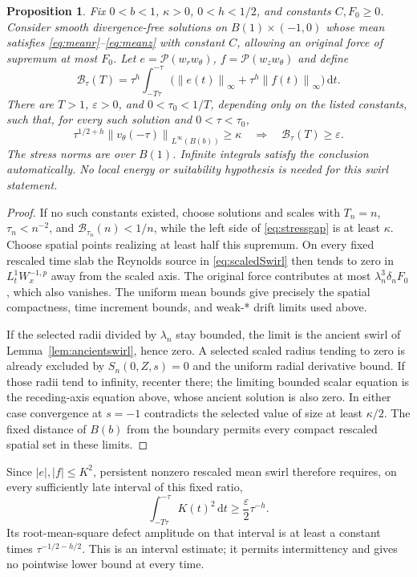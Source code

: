 \documentclass[11pt]{article}
\newtheorem{proposition}[theorem]{Proposition}
\theoremstyle{remark}
\newcommand{\PP}{\mathcal P}
\newcommand{\dd}{\,\mathrm d}
\newcommand{\norm}[1]{\left\lVert#1\right\rVert}
\begin{document}
\begin{proposition}\label{prop:stressgap}
Fix $0<b<1$, $\kappa>0$, $0<h<1/2$, and constants $C,F_0\geq0$.
Consider smooth divergence-free solutions on $B(1)\times(-1,0)$
whose mean satisfies \eqref{eq:meanr}--\eqref{eq:meanz} with constant
$C$, allowing an original force of supremum at most $F_0$.
Let $e=\PP(w_rw_\theta)$, $f=\PP(w_zw_\theta)$ and define
\[
 \mathcal B_\tau(T)=\tau^h\int_{-T\tau}^{-\tau}
       \big(\norm{e(t)}_\infty+\tau^h\norm{f(t)}_\infty\big)\dd t.
\]
There are $T>1$, $\varepsilon>0$, and $0<\tau_0<1/T$, depending
only on the listed constants, such that, for every such solution and
$0<\tau<\tau_0$,
\begin{equation}\label{eq:stressgap}
 \tau^{1/2+h}\norm{v_\theta(-\tau)}_{L^\infty(B(b))}\geq\kappa
       \quad\Longrightarrow\quad
       \mathcal B_\tau(T)\geq\varepsilon.
\end{equation}
The stress norms are over $B(1)$. Infinite integrals satisfy the
conclusion automatically. No local energy or suitability hypothesis is
needed for this swirl statement.
\end{proposition}
\begin{proof}
If no such constants existed, choose solutions and scales with
$T_n=n$, $\tau_n<n^{-2}$, and
$\mathcal B_{\tau_n}(n)<1/n$, while the left side of
\eqref{eq:stressgap} is at least $\kappa$. Choose spatial points
realizing at least half this supremum. On every fixed rescaled time
slab the Reynolds source in \eqref{eq:scaledSwirl} then tends to zero
in $L^1_tW^{-1,p}_x$ away from the scaled axis. The original force
contributes at most $\lambda_n^3\delta_n F_0$, which also vanishes.
The uniform mean bounds give precisely the spatial compactness,
time increment bounds, and weak-* drift limits used above.

If the selected radii divided by $\lambda_n$ stay bounded, the
limit is the ancient swirl of Lemma~\ref{lem:ancientswirl}, hence zero.
A selected scaled radius tending to zero is already excluded by
$S_n(0,Z,s)=0$ and the uniform radial derivative bound.
If those radii tend to infinity, recenter there; the limiting bounded
scalar equation is the receding-axis equation above, whose ancient
solution is also zero. In either case convergence at $s=-1$
contradicts the selected value of size at least $\kappa/2$.
The fixed distance of $B(b)$ from the boundary permits every compact
rescaled spatial set in these limits.
\end{proof}

Since $|e|,|f|\leq K^2$, persistent nonzero rescaled mean swirl therefore
requires, on every sufficiently late interval of this fixed ratio,
\begin{equation}\label{eq:stresscost}
 \int_{-T\tau}^{-\tau}K(t)^2\dd t
       \geq\frac{\varepsilon}{2}\tau^{-h}.
\end{equation}
Its root-mean-square defect amplitude on that interval is at least a
constant times $\tau^{-1/2-h/2}$. This is an interval estimate;
it permits intermittency and gives no pointwise lower bound at every time.
\end{document}
